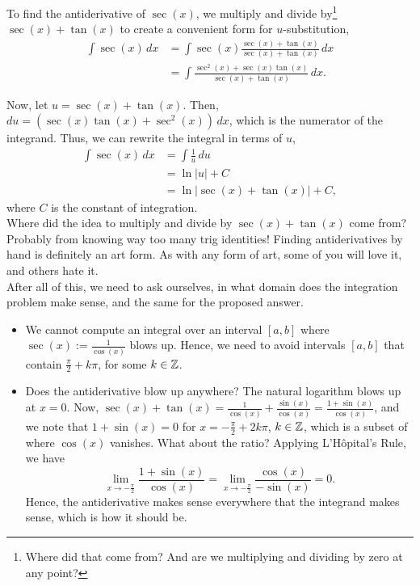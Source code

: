 To find the antiderivative of \( \sec(x) \), we multiply and divide by\footnote{Where did that come from? And are we multiplying and dividing by zero at any point?} \( \sec(x) + \tan(x) \) to create a convenient form for $u$-substitution,
\begin{align*}
\int \sec(x) \, dx &= \int \sec(x) \frac{\sec(x) + \tan(x)}{\sec(x) + \tan(x)} \, dx \\
&= \int \frac{\sec^2(x) + \sec(x)\tan(x)}{\sec(x) + \tan(x)} \, dx.
\end{align*}

Now, let \( u = \sec(x) + \tan(x) \). Then, \( du = (\sec(x)\tan(x) + \sec^2(x)) \, dx \), which is the numerator of the integrand. Thus, we can rewrite the integral in terms of \( u \),
\begin{align*}
\int \sec(x) \, dx &= \int \frac{1}{u} \, du \\
&= \ln|u| + C \\
&= \ln|\sec(x) + \tan(x)| + C,
\end{align*}
where \( C \) is the constant of integration.\\

Where did the idea to multiply and divide by \( \sec(x) + \tan(x) \) come from? Probably from knowing way too many trig identities! Finding antiderivatives by hand is definitely an art form. As with any form of art, some of you will love it, and others hate it. \\

After all of this, we need to ask ourselves, in what domain does the integration problem make sense, and the same for the proposed answer. 
\begin{itemize}
    \item We cannot compute an integral over an interval $[a, b]$ where $\sec(x):=\frac{1}{\cos(x)}$ blows up. Hence, we need to avoid intervals $[a, b]$ that contain $\frac{\pi}{2} + k \pi$, for some $k \in \mathbb Z$. 
    \item Does the antiderivative blow up anywhere? The natural logarithm blows up at $x=0$. Now, $\sec(x) + \tan(x) = \frac{1}{\cos(x)} + \frac{\sin(x)}{\cos(x)} = \frac{1+ \sin(x)}{\cos(x)}$, and we note that
    $1 + \sin(x) =0$ for $x = -\frac{\pi}{2} + 2k \pi$, $k \in \mathbb Z$, which is a subset of where $\cos(x)$ vanishes. What about the ratio? Applying L'H\^opital's Rule, we have
    $$ \lim_{x \to -\frac{\pi}{2}}  \frac{1 + \sin(x)}{\cos(x)} =  \lim_{x \to -\frac{\pi}{2}} \frac{\cos(x)}{- \sin(x)} = 0.$$
    Hence, the antiderivative makes sense everywhere that the integrand makes sense, which is how it should be.
\end{itemize}
\Qed
\bigskip

